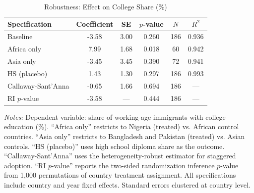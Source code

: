 \begin{table}[t]
\centering
\caption{Robustness: Effect on College Share (\%)}
\label{tab:robustness}
\small
\begin{threeparttable}
\begin{tabular}{lccccc}
\toprule
Specification & Coefficient & SE & $p$-value & $N$ & $R^2$ \\
\midrule
Baseline & -3.58 & 3.00 & 0.260 & 186 & 0.936 \\
Africa only & 7.99 & 1.68 & 0.018 & 60 & 0.942 \\
Asia only & -3.45 & 3.45 & 0.390 & 72 & 0.941 \\
HS (placebo) & 1.43 & 1.30 & 0.297 & 186 & 0.993 \\
Callaway-Sant'Anna & -0.65 & 1.66 & 0.694 & 186 & --- \\
RI $p$-value & -3.58 & --- & 0.444 & 186 & --- \\
\bottomrule
\end{tabular}
\begin{tablenotes}[flushleft]
\small
\item \textit{Notes:} Dependent variable: share of working-age immigrants with college education (\%). ``Africa only'' restricts to Nigeria (treated) vs. African control countries. ``Asia only'' restricts to Bangladesh and Pakistan (treated) vs. Asian controls. ``HS (placebo)'' uses high school diploma share as the outcome. ``Callaway-Sant'Anna'' uses the heterogeneity-robust estimator for staggered adoption. ``RI $p$-value'' reports the two-sided randomization inference $p$-value from 1,000 permutations of country treatment assignment. All specifications include country and year fixed effects. Standard errors clustered at country level.
\end{tablenotes}
\end{threeparttable}
\end{table}
